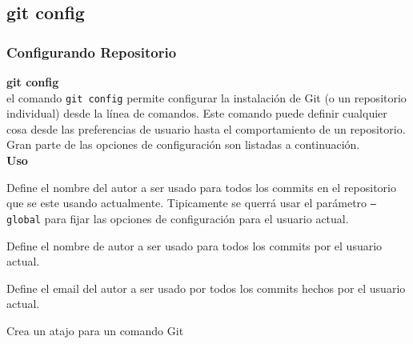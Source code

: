 \documentclass[8pt]{beamer}
\begin{document}
\subsection{git config}
\begin{frame} 
\frametitle{Configurando Repositorio}
\textbf{git config}\\
\medskip
el comando \texttt{git config} permite configurar la instalaci\'on de Git (o un repositorio individual) desde la l\'inea de comandos. Este comando puede definir cualquier cosa desde las preferencias de usuario hasta el comportamiento de un repositorio. Gran parte de las opciones de configuraci\'on son listadas a continuaci\'on.\\
\medskip
\textbf{Uso}\\
\medskip

Define el nombre del autor a ser usado para todos los commits en el repositorio que se este usando actualmente. Tipicamente se querr\'a usar el par\'ametro \texttt{--global} para fijar las opciones de configuraci\'on para el usuario actual.

Define el nombre de autor a ser usado para todos los commits por el usuario actual.

Define el email del autor a ser usado por todos los commits hechos por el usuario actual.

Crea un atajo para un comando Git
\end{frame}

\end{document}
